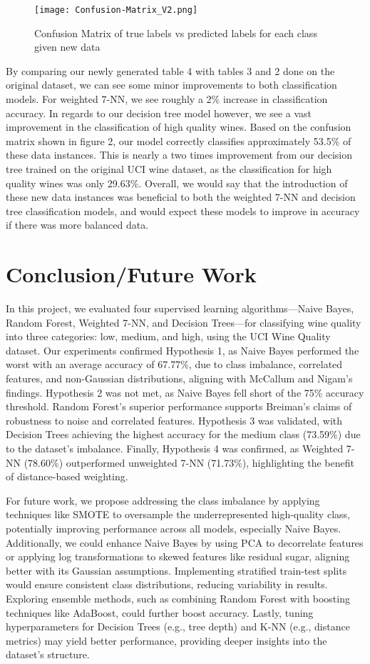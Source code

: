 \documentclass{article}
\theoremstyle{plain}
\theoremstyle{definition}
\theoremstyle{remark}
\begin{document}
\begin{figure}
    \centering
    \texttt{[image: Confusion-Matrix\_V2.png]}
    \caption{Confusion Matrix of true labels vs predicted labels for each class given new data}
\end{figure}

By comparing our newly generated table 4 with tables 3 and 2 done on the original dataset, we can see some minor improvements to both classification models. For weighted 7-NN, we see roughly a 2\% increase in classification accuracy. In regards to our decision tree model however, we see a vast improvement in the classification of high quality wines. Based on the confusion matrix shown in figure 2, our model correctly classifies approximately 53.5\% of these data instances. This is nearly a two times improvement from our decision tree trained on the original UCI wine dataset, as the classification for high quality wines was only 29.63\%. Overall, we would say that the introduction of these new data instances was beneficial to both the weighted 7-NN and decision tree classification models, and would expect these models to improve in accuracy if there was more balanced data.
\section{Conclusion/Future Work}

In this project, we evaluated four supervised learning algorithms—Naive Bayes, Random Forest, Weighted 7-NN, and Decision Trees—for classifying wine quality into three categories: low, medium, and high, using the UCI Wine Quality dataset. Our experiments confirmed Hypothesis 1, as Naive Bayes performed the worst with an average accuracy of 67.77\%, due to class imbalance, correlated features, and non-Gaussian distributions, aligning with McCallum and Nigam's findings. Hypothesis 2 was not met, as Naive Bayes fell short of the 75\% accuracy threshold. Random Forest's superior performance supports Breiman's claims of robustness to noise and correlated features. Hypothesis 3 was validated, with Decision Trees achieving the highest accuracy for the medium class (73.59\%) due to the dataset's imbalance. Finally, Hypothesis 4 was confirmed, as Weighted 7-NN (78.60\%) outperformed unweighted 7-NN (71.73\%), highlighting the benefit of distance-based weighting.

For future work, we propose addressing the class imbalance by applying techniques like SMOTE to oversample the underrepresented high-quality class, potentially improving performance across all models, especially Naive Bayes. Additionally, we could enhance Naive Bayes by using PCA to decorrelate features or applying log transformations to skewed features like residual sugar, aligning better with its Gaussian assumptions. Implementing stratified train-test splits would ensure consistent class distributions, reducing variability in results. Exploring ensemble methods, such as combining Random Forest with boosting techniques like AdaBoost, could further boost accuracy. Lastly, tuning hyperparameters for Decision Trees (e.g., tree depth) and K-NN (e.g., distance metrics) may yield better performance, providing deeper insights into the dataset's structure.
\end{document}
